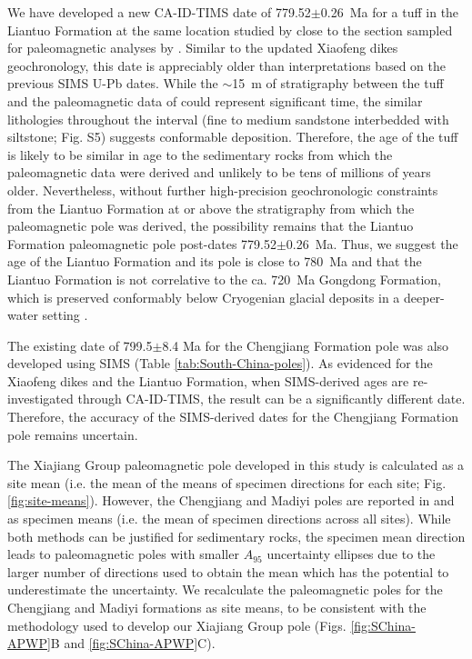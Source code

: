 We have developed a new CA-ID-TIMS date of 779.52$\pm$0.26~Ma for a tuff in the Liantuo Formation at the same location studied by \citet{Ma1984a} close to the section sampled for paleomagnetic analyses by \citet{Evans2000a}. Similar to the updated Xiaofeng dikes geochronology, this date is appreciably older than interpretations based on the previous SIMS U-Pb dates. While the $\sim$15~m of stratigraphy between the tuff and the paleomagnetic data of \citet{Evans2000a} could represent significant time, the similar lithologies throughout the interval (fine to medium sandstone interbedded with siltstone; Fig. S5) suggests conformable deposition. Therefore, the age of the tuff is likely to be similar in age to the sedimentary rocks from which the paleomagnetic data were derived and unlikely to be tens of millions of years older. Nevertheless, without further high-precision geochronologic constraints from the Liantuo Formation at or above the stratigraphy from which the paleomagnetic pole was derived, the possibility remains that the Liantuo Formation paleomagnetic pole post-dates 779.52$\pm$0.26~Ma. Thus, we suggest the age of the Liantuo Formation and its pole is close to 780~Ma and that the Liantuo Formation is not correlative to the ca. 720~Ma Gongdong Formation, which is preserved conformably below Cryogenian glacial deposits in a deeper-water setting \citep{Lan2020a}.

The existing date of 799.5$\pm$8.4 Ma for the Chengjiang Formation pole was also developed using SIMS (Table \ref{tab:South-China-poles}). As evidenced for the Xiaofeng dikes and the Liantuo Formation, when SIMS-derived ages are re-investigated through CA-ID-TIMS, the result can be a significantly different date. Therefore, the accuracy of the SIMS-derived dates for the Chengjiang Formation pole remains uncertain.

The Xiajiang Group paleomagnetic pole developed in this study is calculated as a site mean (i.e. the mean of the means of specimen directions for each site; Fig. \ref{fig:site-means}). However, the Chengjiang and Madiyi poles are reported in \citet{Jing2019a} and \citet{Xian2020a} as specimen means (i.e. the mean of specimen directions across all sites). While both methods can be justified for sedimentary rocks, the specimen mean direction leads to paleomagnetic poles with smaller $A_{95}$ uncertainty ellipses due to the larger number of directions used to obtain the mean which has the potential to underestimate the uncertainty. We recalculate the paleomagnetic poles for the Chengjiang and Madiyi formations as site means, to be consistent with the methodology used to develop our Xiajiang Group pole (Figs. \ref{fig:SChina-APWP}B and \ref{fig:SChina-APWP}C).

